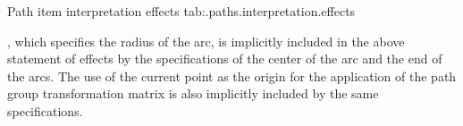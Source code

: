 \begin{libreqtab2a} {Path item interpretation effects} {tab:\iotwod.paths.interpretation.effects}
\begin{note} , which specifies the radius of the arc, is implicitly included in the above statement of effects by the specifications of the center of the arc and the end of the arcs. The use of the current point as the origin for the application of the path group transformation matrix is also implicitly included by the same specifications. \end{note} \\
\end{libreqtab2a}
